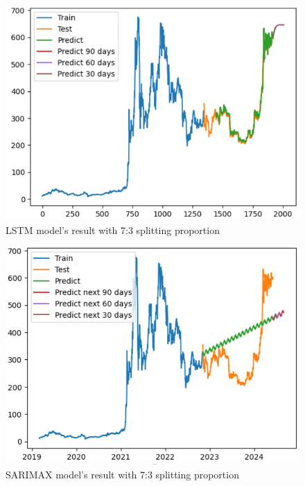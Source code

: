 \documentclass{ieeeojies}
\begin{document}
\begin{figure}[H]
	\centering
	\begin{minipage}{0.6\linewidth}
		\centering
		\includegraphics[width=\linewidth]{bibliography/Images/LSTM_BNB_73.PNG}
		\caption{LSTM model's result with 7:3 splitting proportion}
	\end{minipage}
\end{figure}
\begin{figure}[H]
	\centering
	\begin{minipage}{0.6\linewidth}
		\centering
		\includegraphics[width=\linewidth]{bibliography/Images/SARIMAX_BNB_73.PNG}
		\caption{SARIMAX model's result with 7:3 splitting proportion}
	\end{minipage}
\end{figure}
\end{document}
